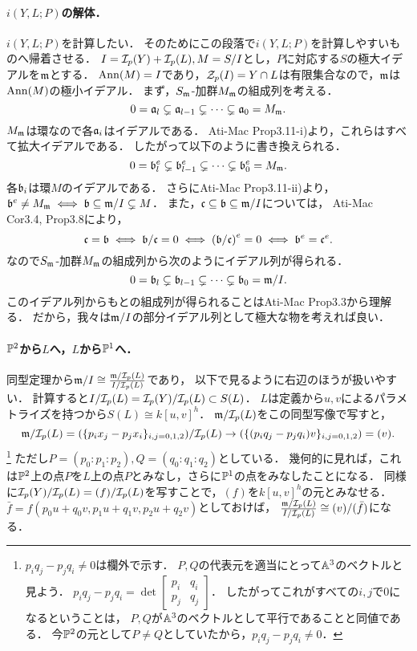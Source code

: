 \documentclass[a4paper]{jsarticle}
\begin{document}
    \paragraph{$i(Y, L; P)$の解体．}
    $i(Y, L; P)$を計算したい．
    そのためにこの段落で$i(Y,L; P)$を計算しやすいものへ帰着させる．
    $I=\mathcal{I}_p(Y)+\mathcal{I}_p(L), M=S/I$とし，$P$に対応する$S$の極大イデアルを$\mathfrak{m}$とする．
    $\operatorname{Ann}(M)=I$であり，$\mathcal{Z}_p(I)=Y \cap L$は有限集合なので，$\mathfrak{m}$は$\operatorname{Ann}(M)$の極小イデアル．
    まず，$S_{\mathfrak{m}}$-加群$M_{\mathfrak{m}}$の組成列を考える．
    \[ 0=\mathfrak{a}_l \subsetneq \mathfrak{a}_{l-1} \subsetneq \dots \subsetneq \mathfrak{a}_0=M_{\mathfrak{m}}. \]
    $M_{\mathfrak{m}}$は環なので各$\mathfrak{a}_i$はイデアルである．
    Ati-Mac Prop3.11-i)より，これらはすべて拡大イデアルである．
    したがって以下のように書き換えられる．
    \[ 0=\mathfrak{b}_l^e \subsetneq \mathfrak{b}_{l-1}^e \subsetneq \dots \subsetneq \mathfrak{b}_0^e=M_{\mathfrak{m}}. \]
    各$\mathfrak{b}_i$は環$M$のイデアルである．
    さらにAti-Mac Prop3.11-ii)より，
    $\mathfrak{b}^e \neq M_{\mathfrak{m}} \iff \mathfrak{b} \subseteq \mathfrak{m}/I \subsetneq M$．
    また，$\mathfrak{c} \subseteq \mathfrak{b} \subseteq \mathfrak{m}/I$については，
    Ati-Mac Cor3.4, Prop3.8により，
    \[ \mathfrak{c}=\mathfrak{b} \iff \mathfrak{b}/\mathfrak{c}=0 \iff \left( \mathfrak{b}/\mathfrak{c} \right)^e=0 \iff \mathfrak{b}^e=\mathfrak{c}^e. \]
    なので$S_{\mathfrak{m}}$-加群$M_{\mathfrak{m}}$の組成列から次のようにイデアル列が得られる．
    \[ 0=\mathfrak{b}_l \subsetneq \mathfrak{b}_{l-1} \subsetneq \dots \subsetneq \mathfrak{b}_0=\mathfrak{m}/I. \]
    このイデアル列からもとの組成列が得られることはAti-Mac Prop3.3から理解る．
    だから，我々は$\mathfrak{m}/I$の部分イデアル列として極大な物を考えれば良い．

    \paragraph{$\mathbb{P}^2$から$L$へ，$L$から$\mathbb{P}^1$へ．}
    同型定理から$\mathfrak{m}/I \cong \frac{\mathfrak{m}/\mathcal{I}_p(L)}{I/\mathcal{I}_p(L)}$であり，
    以下で見るように右辺のほうが扱いやすい．
    計算すると$I/\mathcal{I}_p(L)=\mathcal{I}_p(Y)/\mathcal{I}_p(L) \subset S(L)$．
    $L$は定義から$u,v$によるパラメトライズを持つから$S(L) \cong k[u,v]^h$．
    $\mathfrak{m}/\mathcal{I}_p(L)$をこの同型写像で写すと，
    \[ \mathfrak{m}/\mathcal{I}_p(L)=(\{p_i x_j-p_j x_i\}_{i,j=0,1,2})/\mathcal{I}_p(L) \to (\{(p_i q_j-p_j q_i)v\}_{i,j=0,1,2})=(v). \]
    \footnote
    {
        $p_i q_j-p_j q_i \neq 0$は欄外で示す．
        $P,Q$の代表元を適当にとって$\mathbb{A}^3$のベクトルと見よう．
        $p_i q_j-p_j q_i=\det \begin{bmatrix} p_i & q_i \\ p_j & q_j \end{bmatrix}$．
        したがってこれがすべての$i,j$で0になるということは，
        $P,Q$が$\mathbb{A}^3$のベクトルとして平行であることと同値である．
        今$\mathbb{P}^2$の元として$P \neq Q$としていたから，$p_i q_j-p_j q_i \neq 0$．
    }
    ただし$P=(p_0:p_1:p_2), Q=(q_0:q_1:q_2)$としている．
    幾何的に見れば，これは$\mathbb{P}^2$上の点$P$を$L$上の点$P$とみなし，さらに$\mathbb{P}^1$の点をみなしたことになる．
    同様に$\mathcal{I}_p(Y)/\mathcal{I}_p(L)=(f)/\mathcal{I}_p(L)$を写すことで，$(f)$を$k[u,v]^h$の元とみなせる．
    $\bar{f}=f(p_0 u+q_0v, p_1 u+q_1v, p_2 u+q_2v)$としておけば，
    $\frac{\mathfrak{m}/\mathcal{I}_p(L)}{I/\mathcal{I}_p(L)} \cong (v)/(\bar{f})$になる．
\end{document}
